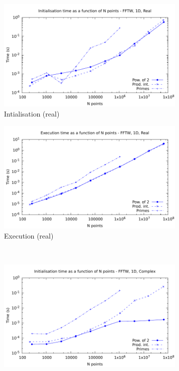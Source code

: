 \documentclass[12pt, a4paper]{article}
\begin{document}
 
\begin{figure}[htb]
\captionsetup{width=0.8\linewidth}
\centering
\begin{subfigure}{.5\textwidth}
\centering
\includegraphics[width=.9\linewidth]{graphs/1d-fftw-init-r.pdf}
\caption{Intialisation (real)}
\label{1DFFTWRI}
\end{subfigure}%
\begin{subfigure}{.5\textwidth}
\centering
\includegraphics[width=.9\linewidth]{graphs/1d-fftw-exec-r.pdf}
\caption{Execution (real)}
\label{1DFFTWR}
\end{subfigure}\\
\begin{subfigure}{.5\textwidth}
\centering
\includegraphics[width=.9\linewidth]{graphs/1d-fftw-init-c.pdf}

\end{subfigure}
\end{figure}
\end{document}
